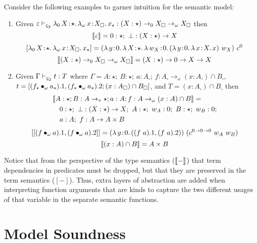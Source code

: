 Consider the following examples to garner intuition for the semantic model:
\begin{enumerate}
    \item {
        Given $\varepsilon \vdash_{\ced} \abs{\lambda_0}{X}{\star}{
            \abs{\lambda_\omega}{x}{X_\square}{x_\star}
        } : (X : \star) \to_0 X_\square \to_\omega X_\square$
        then $$\llbracket \varepsilon \rrbracket = 0 : \star;\ \bot : (X : \star) \to X$$
        $$[\abs{\lambda_0}{X}{\star}{
            \abs{\lambda_\omega}{x}{X_\square}{x_\star}
        }] = (\abs{\lambda}{y}{0}{
            \abs{\lambda}{X}{\star}{
                \abs{\lambda}{w_X}{0}{
                    (\abs{\lambda}{y}{0}
                        \abs{\lambda}{x}{X}{x}
                    )\ w_X
                }
            }
        })\ c^0$$
        $$\llbracket (X : \star) \to_0 X_\square \to_\omega X_\square \rrbracket
            = (X : \star) \to 0 \to X \to X$$
    }
    \item {
        Given $\Gamma \vdash_{\ced} t : T$ where $\Gamma = A : \star;\ B : \star;\ a : A_\square;\ f : A_\square \to_\omega (x : A_\square) \cap B_\square$, $t = [(f_\star \bullet_{\omega} a_\star).1, (f_\star \bullet_{\omega} a_\star).2; (x : A_\square) \cap B_\square]$, and $T = (x : A_\square) \cap B_\square$ then
        \begin{align*}
            &\llbracket A : \star; B : A \to_\tau \star; a : A; f : A \to_\omega (x : A) \cap B \rrbracket =\\
            &\quad 0 : \star;\ \bot : (X : \star) \to X;\ A : \star;\ w_A : 0;\ B : \star;\ w_B : 0; \\
            &\quad a : A;\ f : A \to A \times B
        \end{align*}
            $$[[(f \bullet_{\omega} a).1, (f \bullet_{\omega} a).2]] = ({\lambda}\, y\! : \! 0.\, 
                ((f\ a).1, (f\ a).2)
           )\ (c^{0 \to 0 \to 0}\ w_A\ w_B)$$
        $$\llbracket (x : A) \cap B \rrbracket = A \times B$$
    }
\end{enumerate}

Notice that from the perspective of the type semantics ($\llbracket - \rrbracket$) that term dependencies in predicates must be dropped, but that they are preserved in the term semantics ($[-]$).
Thus, extra layers of abstraction are added when interpreting function arguments that are kinds to capture the two different usages of that variable in the separate semantic functions.

\section{Model Soundness}

